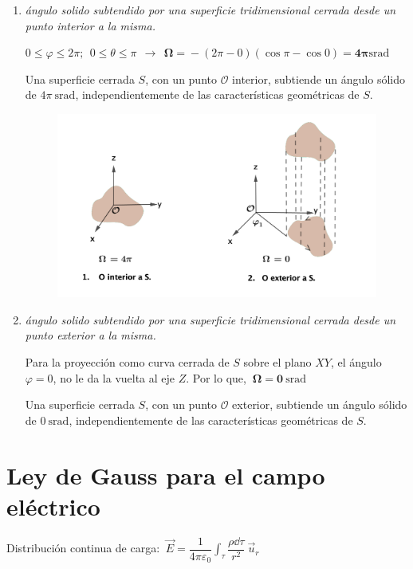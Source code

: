 \begin{enumerate}
\item 	 \emph{ángulo solido subtendido por una superficie tridimensional cerrada desde un punto interior a la misma.}

$0\leq \varphi\leq 2\pi;\ \  0\leq \theta\leq \pi \ \ \to \ \  \boldsymbol{\Omega=}-(2\pi-0)(\cos \pi -\cos 0) \boldsymbol{= 4\pi}  \mathrm{srad}$

Una superficie cerrada $S$, con un punto $\mathcal O$ interior, subtiende un ángulo sólido de $4\pi\ \mathrm{srad}$, independientemente de las características geométricas de $S$.

\begin{figure}[H]
	\centering
	\includegraphics[width=1\textwidth]{imagenes/imagenes23/T23IM05.png}
\end{figure}

\item  \emph{ángulo solido subtendido por una superficie tridimensional cerrada desde un punto exterior a la misma.}

Para la proyección como curva cerrada de $S$ sobre el plano $XY$, el ángulo $\varphi=0$, no le da la vuelta al eje $Z$. Por lo que, $\ \boldsymbol{\Omega =0 \ \mathrm{srad}}$ 

Una superficie cerrada $S$, con un punto $\mathcal O$ exterior, subtiende un ángulo sólido de $0\ \mathrm{srad}$, independientemente de las características geométricas de $S$.
\end{enumerate}

\section{Ley de Gauss para el campo eléctrico}

Distribución continua de carga: $\displaystyle \ \vec E=\dfrac 1{4\pi \varepsilon_0} \int_\tau \dfrac{\rho \dd \tau}{r^2} \ \vec u_r$

